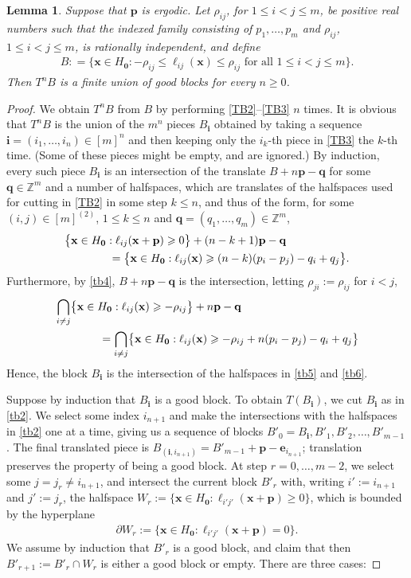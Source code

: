 \documentclass[11pt,reqno,tbtags,a4paper]{amsart}
\numberwithin{equation}{section}
\renewcommand\le{\leq}
\renewcommand\ge{\geq}
\renewcommand\leq{\leqslant}
\renewcommand\geq{\geqslant}
\theoremstyle{plain}%
\newtheorem{lemma}[theorem]{Lemma}
\theoremstyle{definition}
\theoremstyle{remark}
\newcounter{cases}
\newcommand\set[1]{\ensuremath{\{#1\}}}
\newcommand\bigset[1]{\ensuremath{\bigl\{#1\bigr\}}}
\newcommand\bbZ{\mathbb Z}
\newcommand\Ho{H_{\0}}
\newcommand\ve{\mathbf{e}}
\newcommand\vi{{\mathbf{i}}}
\newcommand\vp{\mathbf{p}}
\newcommand\vq{\mathbf{q}}
\newcommand\vx{\mathbf{x}}
\newcommand\dW{\partial W}
\newcommand\mmx{[m]^{(2)}}
\newcommand\0{{\boldsymbol 0}}
\newcommand\1{{\boldsymbol 1}}
\begin{document}
\begin{lemma}\label{LTB}
  Suppose that $\vp$ is ergodic.
Let $\rho_{ij}$, for $1\le i<j\le m$, be positive real numbers such that
the indexed family consisting of $p_1,\dots,p_m$ and
$\rho_{ij}$, $1\le i<j\le m$, is rationally independent,
and define
\begin{align}\label{tb4}
B: =\bigset{\vx\in \Ho: -\rho_{ij}\le \ell_{ij}(\vx)\le \rho_{ij}
\text{ for all $1\le i<j\le m$}}.   
\end{align}
Then $T^n B$ is a finite union of good blocks for every $n\ge0$.
\end{lemma}

\begin{proof}
We obtain $T^n B$ from $B$ by performing \ref{TB2}--\ref{TB3} $n$ times.
It is obvious that $T^nB$ is the union of  the $m^n$ pieces $B_\vi$
obtained by taking  a sequence $\vi=(i_1,\dots,i_n)\in[m]^n$ and then
keeping only the $i_k$-th piece in \ref{TB3} the $k$-th time.
(Some of these pieces might be empty, and are ignored.)
By induction, every such piece $B_\vi$ is
an intersection of the translate $B+n\vp-\vq$ for some $\vq\in \bbZ^m$
and a number of halfspaces, which are translates of the halfspaces used for
cutting in \ref{TB2} in some step $k\le n$, and thus of the form,
for some $(i,j)\in\mmx$, $1\le k\le n$  and $\vq=(q_1,\dots,q_m)\in\bbZ^m$,
\begin{align}\label{tb5}
&  \bigset{\vx\in \Ho: \ell_{ij}(\vx+\vp)\ge0}+(n-k+1)\vp-\vq
\notag\\&\hskip4em
=
  \bigset{\vx\in \Ho: \ell_{ij}(\vx)\ge (n-k)(p_i-p_j)-q_i+q_j}.
\end{align}
Furthermore, by \eqref{tb4}, $B+n\vp-\vq$ is the intersection,
letting $\rho_{ji}:=\rho_{ij}$ for $i<j$,
\begin{align}\label{tb6}
&  \bigcap_{i\neq j} \bigset{\vx\in\Ho: \ell_{ij}(\vx)\ge -\rho_{ij}}
+n\vp-\vq
\notag\\&\hskip4em
= \bigcap_{i\neq j} \bigset{\vx\in\Ho: \ell_{ij}(\vx)
\ge -\rho_{ij}+n(p_i-p_j)-q_i+q_j}
\end{align}
Hence, the block $B_\vi$ is the intersection of the halfspaces in
\eqref{tb5} and \eqref{tb6}.

Suppose by induction that $B_\vi$ is a good block. To obtain $T(B_\vi)$, we
cut $B_\vi$ as in \eqref{tb2}. We select some index $i_{n+1}$ and make the
intersections with the halfspaces in \eqref{tb2} one at a time, giving us a
sequence of blocks $B'_0=B_\vi,B'_1, B'_2, \dots,B'_{m-1}$.
The final translated piece is
$B_{(\vi,i_{n+1})}=B'_{m-1}+\vp-\ve_{i_{n+1}}$;
translation preserves the property of being a good block.
At step $r=0,\dots,m-2$, we select some $j=j_r\neq i_{n+1}$, 
and intersect the current block $B'_r$
with, writing $i':=i_{n+1}$ and $j':=j_r$,
the halfspace 
$W_r:=\set{\vx\in \Ho:\ell_{i'j'}(\vx+\vp)\ge0}$, which is bounded by the
hyperplane 
\begin{align}\label{tb7}
\dW_r:=\set{\vx\in \Ho:\ell_{i'j'}(\vx+\vp)=0}.  
\end{align}
We assume by induction that $B'_r$ is a good block, and claim that
then $B'_{r+1}:=B'_r\cap W_r$ is either a good block or empty.
There are three cases:


\end{proof}
\end{document}

